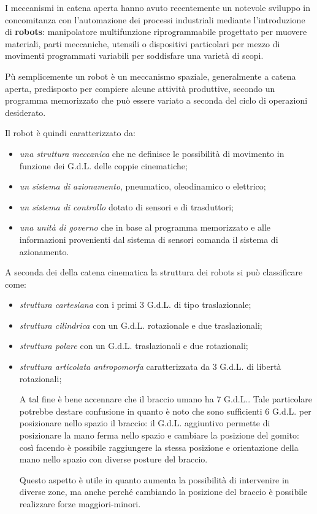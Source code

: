 I meccanismi in catena aperta hanno avuto recentemente un notevole sviluppo in concomitanza con l'automazione dei processi industriali mediante l'introduzione di \textbf{robots}: manipolatore multifunzione riprogrammabile progettato per muovere materiali, parti meccaniche, utensili o dispositivi particolari per mezzo di movimenti programmati variabili per soddisfare una varietà di scopi.

Pù semplicemente un robot è un meccanismo spaziale, generalmente a catena aperta, predisposto per compiere alcune attività produttive, secondo un programma memorizzato che può essere variato a seconda del ciclo di operazioni desiderato.

Il robot è quindi caratterizzato da:
\begin{itemize}
\item \emph{una struttura meccanica} che ne definisce le possibilità di movimento in funzione dei G.d.L. delle coppie cinematiche;
\item \emph{un sistema di azionamento}, pneumatico, oleodinamico o elettrico;
\item \emph{un sistema di controllo} dotato di sensori e di trasduttori;
\item \emph{una unità di governo} che in base al programma memorizzato e alle informazioni provenienti dal sistema di sensori comanda il sistema di azionamento.
\end{itemize}

A seconda dei  della catena cinematica la struttura dei robots si può classificare come:
\begin{itemize}
\item \emph{struttura cartesiana} con i primi 3 G.d.L. di tipo traslazionale;
\item \emph{struttura cilindrica} con un G.d.L. rotazionale e due traslazionali;
\item \emph{struttura polare} con un G.d.L. traslazionali e due rotazionali;
\item \emph{struttura articolata antropomorfa} caratterizzata da 3 G.d.L. di libertà rotazionali;

A tal fine è bene accennare che il braccio umano ha 7 G.d.L.. Tale particolare potrebbe destare confusione in quanto è noto che sono sufficienti 6 G.d.L. per posizionare nello spazio il braccio: il G.d.L. aggiuntivo permette di posizionare la mano ferma nello spazio e cambiare la posizione del gomito: così facendo è possibile raggiungere la stessa posizione e orientazione della mano nello spazio con diverse posture del braccio. 

Questo aspetto è utile in quanto aumenta la possibilità di intervenire in diverse zone, ma anche perché cambiando la posizione del braccio è possibile realizzare forze maggiori-minori.
\end{itemize}

